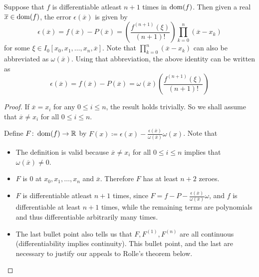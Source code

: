 \begin{thm}
  \label{mar11b:thm:err_thm}
  Suppose that $f$ is differentiable atleast $n+1$ times in $\operatorname{dom}(f)$. Then given a real $\overline{x} \in \operatorname{dom}(f)$, the error $\epsilon(\overline{x})$ is given by
  \[
    \epsilon(\overline{x}) = f(\overline{x}) - P(\overline{x}) = \left(\frac{f^{(n+1)}(\xi)}{(n+1)!}\right)\prod_{k = 0}^n (\overline{x} - x_k)
  \]
  for some $\xi \in I_0[x_0, x_1, \dots ,x_n, \overline{x}]$. Note that $\prod_{k = 0}^n (\overline{x} - x_k)$ can also be abbreviated as $\omega(\overline{x})$. Using that abbreviation, the above identity can be written as
  \[
    \epsilon(\overline{x}) = f(\overline{x}) - P(\overline{x}) = \omega(\overline{x})\left(\frac{f^{(n+1)}(\xi)}{(n+1)!}\right)
  \]
\end{thm}
\begin{proof}
  If $\overline{x} = x_i$ for any $0 \leq i \leq n$, the result holds trivially. So we shall assume that $\overline{x} \neq x_i$ for all $0 \leq i \leq n$.

  Define $F \colon \operatorname{dom}(f) \to \mathbb{R}$ by $F(x) \coloneqq \epsilon(x) - \frac{\epsilon(\overline{x})}{\omega(\overline{x})}\omega(x)$. Note that
  \begin{itemize}
    \item
      The definition is valid because $\overline{x} \neq x_i$ for all $0 \leq i \leq n$ implies that $\omega(\overline{x}) \neq 0$.
    \item
      $F$ is 0 at $x_0, x_1, \dots ,x_n$ and $\overline{x}$. Therefore $F$ has at least $n+2$ zeroes.
    \item
      $F$ is differentiable atleast $n+1$ times, since $F = f - P - \frac{\epsilon(\overline{x})}{\omega(\overline{x})}\omega$, and $f$ is differentiable at least $n+1$ times, while the remaining terms are polynomials and thus differentiable arbitrarily many times.
    \item
      The last bullet point also tells us that $F, F^{(1)}, F^{(n)}$ are all continuous (differentiability implies continuity). This bullet point, and the last are necessary to justify our appeals to Rolle's theorem below.
  \end{itemize}


\end{proof}

